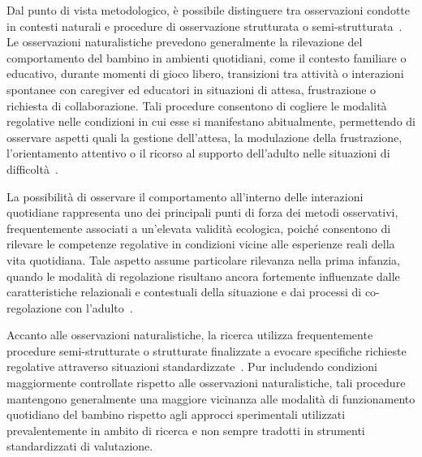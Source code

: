             Dal punto di vista metodologico, è possibile distinguere tra osservazioni condotte in contesti naturali e procedure di osservazione strutturata o semi-strutturata~\cite{carlson2005,garon2008}. Le osservazioni naturalistiche prevedono generalmente la rilevazione del comportamento del bambino in ambienti quotidiani, come il contesto familiare o educativo, durante momenti di gioco libero, transizioni tra attività o interazioni spontanee con caregiver ed educatori in situazioni di attesa, frustrazione o richiesta di collaborazione. Tali procedure consentono di cogliere le modalità regolative nelle condizioni in cui esse si manifestano abitualmente, permettendo di osservare aspetti quali la gestione dell'attesa, la modulazione della frustrazione, l'orientamento attentivo o il ricorso al supporto dell'adulto nelle situazioni di difficoltà~\cite{calkins2007,berni2025}.

            La possibilità di osservare il comportamento all'interno delle interazioni quotidiane rappresenta uno dei principali punti di forza dei metodi osservativi, frequentemente associati a un'elevata validità ecologica, poiché consentono di rilevare le competenze regolative in condizioni vicine alle esperienze reali della vita quotidiana. Tale aspetto assume particolare rilevanza nella prima infanzia, quando le modalità di regolazione risultano ancora fortemente influenzate dalle caratteristiche relazionali e contestuali della situazione e dai processi di co-regolazione con l'adulto~\cite{calkins2007}.

            Accanto alle osservazioni naturalistiche, la ricerca utilizza frequentemente procedure semi-strutturate o strutturate finalizzate a evocare specifiche richieste regolative attraverso situazioni standardizzate~\cite{carlson2005,garon2008}. Pur includendo condizioni maggiormente controllate rispetto alle osservazioni naturalistiche, tali procedure mantengono generalmente una maggiore vicinanza alle modalità di funzionamento quotidiano del bambino rispetto agli approcci sperimentali utilizzati prevalentemente in ambito di ricerca e non sempre tradotti in strumenti standardizzati di valutazione.

